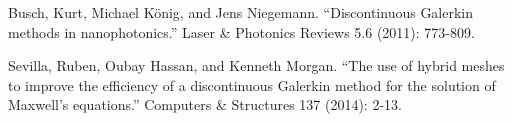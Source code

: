 \documentclass[times,11pt]{ACME2015article}
\begin{document}
\begin{thebibliography}{99}
Busch, Kurt, Michael König, and Jens Niegemann. ``Discontinuous Galerkin methods in nanophotonics.'' Laser \& Photonics Reviews 5.6 (2011): 773-809.

Sevilla, Ruben, Oubay Hassan, and Kenneth Morgan. ``The use of hybrid meshes to improve the efficiency of a discontinuous Galerkin method for the solution of Maxwell’s equations.'' Computers \& Structures 137 (2014): 2-13.

\end{thebibliography}
\end{document}
